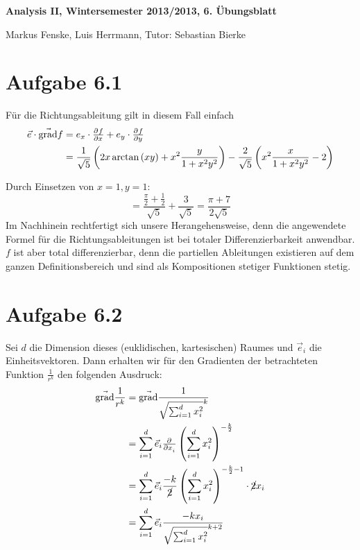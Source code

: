 \documentclass[a4paper,german,12pt,smallheadings]{scrartcl}
\begin{document}
\begin{center}
\bfseries %
\sffamily %
\vspace{-40pt}
Analysis II, Wintersemester 2013/2013, 6. Übungsblatt

Markus Fenske, Luis Herrmann, Tutor: Sebastian Bierke
\vspace{-10pt}
\end{center}
\allowdisplaybreaks %
\section*{Aufgabe 6.1}
Für die Richtungsableitung gilt in diesem Fall einfach
\begin{align*}
  \vec{e} \cdot \vec{\operatorname{grad}} f &= e_x \cdot \pd{f}{x} + e_y \cdot \pd{f}{y} \\
                                            &= \frac{1}{\sqrt{5}} \del{2x \arctan\del{xy} + x^2 \frac{y}{1+x^2y^2}}
                                               - \frac{2}{\sqrt{5}} \del{x^2 \frac{x}{1+x^2y^2} - 2}
\end{align*}

Durch Einsetzen von $x=1, y=1$:
\begin{equation*}
  = \frac{\frac{\pi}{2} + \frac{1}{2}}{\sqrt{5}} + \frac{3}{\sqrt{5}} = \frac{\pi+7}{2\sqrt{5}}
\end{equation*}
Im Nachhinein rechtfertigt sich unsere Herangehensweise, denn die angewendete Formel für die Richtungsableitungen ist bei totaler Differenzierbarkeit anwendbar. $f$ ist aber total differenzierbar, denn die partiellen Ableitungen existieren auf dem ganzen Definitionsbereich und sind als Kompositionen stetiger Funktionen stetig.

\section*{Aufgabe 6.2}
Sei $d$ die Dimension dieses (euklidischen, kartesischen) Raumes und $\vec{e}_i$ die Einheitsvektoren. Dann erhalten wir für den Gradienten der betrachteten Funktion $\frac{1}{r^k}$ den folgenden Ausdruck:
\begin{align*}
  \vec{\operatorname{grad}} \frac{1}{r^k} &= \vec{\operatorname{grad}} \frac{1}{\sqrt{\sum_{i=1}^d x_i^2}^k} \\
                                          &= \sum_{i=1}^d \vec{e}_i \pd{}{x_i} \del{\sum_{i=1}^d x_i^2}^{-\frac{k}{2}} \\
                                          &= \sum_{i=1}^d \vec{e}_i \frac{-k}{\cancel{2}} \del{\sum_{i=1}^d x_i^2}^{-\frac{k}{2}-1} \cdot \cancel{2} x_i \\
                                          &= \sum_{i=1}^d \vec{e}_i \frac{-kx_i}{\sqrt{\sum_{i=1}^d x_i^2}^{k+2}}
\end{align*}
\end{document}
